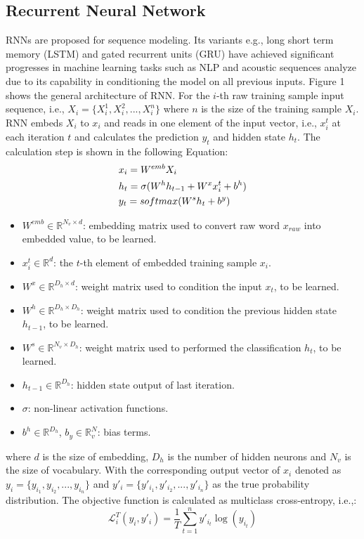 \documentclass[twoside,leqno,twocolumn]{article}
\begin{document}
\subsection{Recurrent Neural Network}
RNNs are proposed for sequence modeling. Its variants e.g., long short term memory (LSTM) and gated recurrent units (GRU) have achieved significant progresses in machine learning tasks such as NLP and acoustic sequences analyze due to its capability in conditioning the model on all previous inputs. Figure 1 shows the general architecture of RNN. For the $i$-th raw training sample input sequence, i.e., $X_i=\{X_{i}^1,X_{i}^2,...,X_{i}^n\}$ where $n$ is the size of the training sample $X_i$. RNN embeds $X_i$ to $x_i$ and reads in one element of the input vector, i.e., $x_{i}^t$ at each iteration $t$ and calculates the prediction $y_t$ and hidden state $h_t$. The calculation step is shown in the following Equation:
\begin{equation}
\begin{aligned}
\label{rnn}
\centering
&x_i=W^{emb}X_i\\
&h_t=\sigma(W^{h}h_{t-1}+W^{x}x_{i}^t+b^h)\\
&y_t=softmax(W^{s}h_t+b^y)
\end{aligned}
\end{equation} 
\begin{itemize}
\item $W^{emb} \in \mathbb{R}^{N_v\times d}$: embedding matrix used to convert raw word $x_{raw}$ into embedded value, to be learned.
\item $x_{i}^t \in \mathbb{R}^d$: the $t$-th element of embedded training sample $x_i$.
\item $W^{x} \in \mathbb{R}^{D_h\times d}$: weight matrix used to condition the input $x_t$, to be learned.
\item $W^{h} \in \mathbb{R}^{D_h\times D_h}$: weight matrix used to condition the previous hidden state $h_{t-1}$, to be learned.
\item $W^s \in \mathbb{R}^{N_v\times D_h}$: weight matrix used to performed the classification $h_t$, to be learned.
\item $h_{t-1} \in \mathbb{R}^{D_h}$: hidden state output of last iteration.
\item $\sigma$: non-linear activation functions.
\item $b^h \in \mathbb{R}^{D_h}$, $b_y \in \mathbb{R}^N_v$: bias terms.
\end{itemize}
where $d$ is the size of embedding, $D_h$ is the number of hidden neurons and $N_v$ is the size of vocabulary. With the corresponding output vector of $x_i$ denoted as $y_i=\{y_{i_1}, y_{i_2},...,y_{i_n}\}$ and $y'_i=\{y'_{i_1},y'_{i_2},...,y'_{i_n}\}$ as the true probability distribution. The objective function is calculated as multiclass cross-entropy, i.e.,:
\begin{equation}
	\mathcal{L}_i^T(y_i,y'_i)=\frac{1}{T}\sum_{t=1}^{n}y'_{i_t}\log(y_{i_t})
\end{equation}
\end{document}
